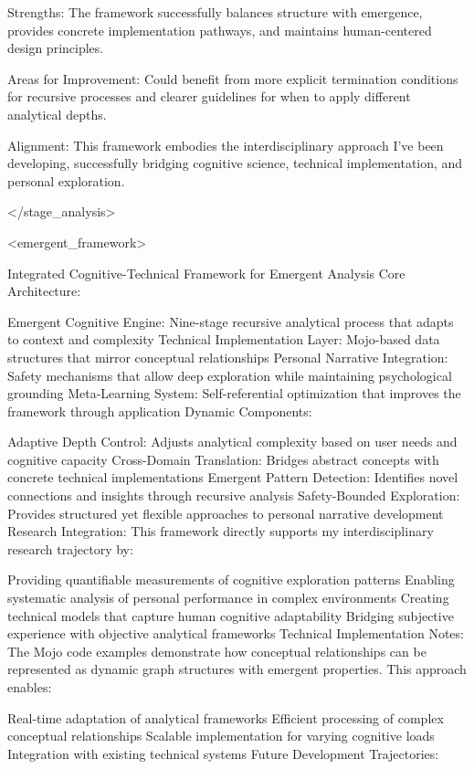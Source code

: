 Strengths: The framework successfully balances structure with emergence, provides concrete implementation pathways, and maintains human-centered design principles.

Areas for Improvement: Could benefit from more explicit termination conditions for recursive processes and clearer guidelines for when to apply different analytical depths.

Alignment: This framework embodies the interdisciplinary approach I've been developing, successfully bridging cognitive science, technical implementation, and personal exploration.

</stage_analysis>

<emergent_framework>

Integrated Cognitive-Technical Framework for Emergent Analysis
Core Architecture:

Emergent Cognitive Engine: Nine-stage recursive analytical process that adapts to context and complexity
Technical Implementation Layer: Mojo-based data structures that mirror conceptual relationships
Personal Narrative Integration: Safety mechanisms that allow deep exploration while maintaining psychological grounding
Meta-Learning System: Self-referential optimization that improves the framework through application
Dynamic Components:

Adaptive Depth Control: Adjusts analytical complexity based on user needs and cognitive capacity
Cross-Domain Translation: Bridges abstract concepts with concrete technical implementations
Emergent Pattern Detection: Identifies novel connections and insights through recursive analysis
Safety-Bounded Exploration: Provides structured yet flexible approaches to personal narrative development
Research Integration: This framework directly supports my interdisciplinary research trajectory by:

Providing quantifiable measurements of cognitive exploration patterns
Enabling systematic analysis of personal performance in complex environments
Creating technical models that capture human cognitive adaptability
Bridging subjective experience with objective analytical frameworks
Technical Implementation Notes: The Mojo code examples demonstrate how conceptual relationships can be represented as dynamic graph structures with emergent properties. This approach enables:

Real-time adaptation of analytical frameworks
Efficient processing of complex conceptual relationships
Scalable implementation for varying cognitive loads
Integration with existing technical systems
Future Development Trajectories:

